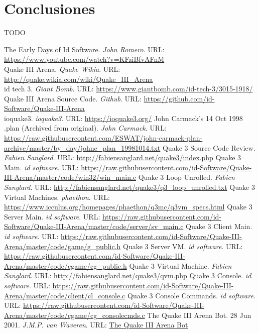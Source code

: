 \documentclass[a4paper,12pt]{report}
\begin{document}
	\section{Conclusiones}
	TODO\\
    
	
	\begin{thebibliography}{9}
		
		The Early Days of Id Software. \emph{John Romero}. URL: \url{https://www.youtube.com/watch?v=KFziBfvAFnM}\\
		Quake III Arena. \emph{Quake Wikia}. URL: \url{http://quake.wikia.com/wiki/Quake_III_Arena}\\
		 id tech 3. \emph{Giant Bomb}. URL: \url{https://www.giantbomb.com/id-tech-3/3015-1918/}\\
		 Quake III Arena Source Code. \emph{Github}. URL: \url{https://github.com/id-Software/Quake-III-Arena}\\
		 ioquake3. \emph{ioquake3}. URL: \url{https://ioquake3.org/}
         John Carmack's 14 Oct 1998 .plan (Archived from original). \emph{John Carmack}. URL: \url{https://raw.githubusercontent.com/ESWAT/john-carmack-plan-archive/master/by_day/johnc_plan_19981014.txt}
		 Quake 3 Source Code Review. \emph{Fabien Sanglard}. URL: \url{http://fabiensanglard.net/quake3/index.php}
		 Quake 3 Main. \emph{id software}. URL: \url{https://raw.githubusercontent.com/id-Software/Quake-III-Arena/master/code/win32/win_main.c}
         Quake 3 Loop Unrolled. \emph{Fabien Sanglard}. URL: \url{http://fabiensanglard.net/quake3/q3_loop_unrolled.txt}
         Quake 3 Virtual Machines. \emph{phaethon}. URL: \url{https://www.icculus.org/homepages/phaethon/q3mc/q3vm_specs.html}
         Quake 3 Server Main. \emph{id software}. URL: \url{https://raw.githubusercontent.com/id-Software/Quake-III-Arena/master/code/server/sv_main.c}
         Quake 3 Client Main. \emph{id software}. URL: \url{https://raw.githubusercontent.com/id-Software/Quake-III-Arena/master/code/game/g_public.h}
         Quake 3 Server VM. \emph{id software}. URL: \url{https://raw.githubusercontent.com/id-Software/Quake-III-Arena/master/code/cgame/cg_public.h}
         Quake 3 Virtual Machine. \emph{Fabien Sanglard}. URL: \url{http://fabiensanglard.net/quake3/qvm.php}
		 Quake 3 Console. \emph{id software}. URL: \url{https://raw.githubusercontent.com/id-Software/Quake-III-Arena/master/code/client/cl_console.c}
		 Quake 3 Console Commands. \emph{id software}. URL: \url{https://raw.githubusercontent.com/id-Software/Quake-III-Arena/master/code/cgame/cg_consolecmds.c}	
		 The Quake III Arena Bot. 28 Jun 2001. \emph{J.M.P. van Waveren}. URL: \url{The Quake III Arena Bot}		
	\end{thebibliography}


	
	
\end{document}

